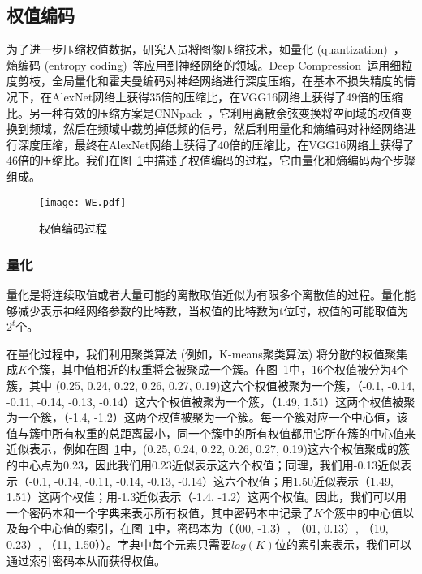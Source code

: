 \subsection{权值编码}


为了进一步压缩权值数据，研究人员将图像压缩技术，如量化 (quantization)~\cite{henneaux1992quantization}，熵编码 (entropy coding)~\cite{mackay2003information}等应用到神经网络的领域。Deep Compression~\cite{han2015deep}运用细粒度剪枝，全局量化和霍夫曼编码对神经网络进行深度压缩，在基本不损失精度的情况下，在AlexNet网络上获得35倍的压缩比，在VGG16网络上获得了49倍的压缩比。另一种有效的压缩方案是CNNpack~\cite{wang2016cnnpack}，它利用离散余弦变换将空间域的权值变换到频域，然后在频域中裁剪掉低频的信号，然后利用量化和熵编码对神经网络进行深度压缩，最终在AlexNet网络上获得了40倍的压缩比，在VGG16网络上获得了46倍的压缩比。我们在图~\ref{fig:weight_encoding}中描述了权值编码的过程，它由量化和熵编码两个步骤组成。

\begin{figure}[h]
\centering
\texttt{[image: WE.pdf]}
\caption{权值编码过程}
\label{fig:weight_encoding}
\end{figure}

\subsubsection{量化}
量化是将连续取值或者大量可能的离散取值近似为有限多个离散值的过程。量化能够减少表示神经网络参数的比特数，当权值的比特数为t位时，权值的可能取值为$2^t$个。

在量化过程中，我们利用聚类算法 (例如，K-means聚类算法) 将分散的权值聚集成$K$个簇，其中值相近的权重将会被聚成一个簇。在图~\ref{fig:weight_encoding}中，16个权值被分为4个簇，其中 (0.25, 0.24, 0.22, 0.26, 0.27, 0.19)这六个权值被聚为一个簇，（-0.1, -0.14, -0.11, -0.14, -0.13, -0.14）这六个权值被聚为一个簇，（1.49, 1.51）这两个权值被聚为一个簇，（-1.4, -1.2）这两个权值被聚为一个簇。每一个簇对应一个中心值，该值与簇中所有权重的总距离最小，同一个簇中的所有权值都用它所在簇的中心值来近似表示，例如在图~\ref{fig:weight_encoding}中，(0.25, 0.24, 0.22, 0.26, 0.27, 0.19)这六个权值聚成的簇的中心点为0.23，因此我们用0.23近似表示这六个权值；同理，我们用-0.13近似表示（-0.1, -0.14, -0.11, -0.14, -0.13, -0.14）这六个权值；用1.50近似表示（1.49, 1.51）这两个权值；用-1.3近似表示（-1.4, -1.2）这两个权值。因此，我们可以用一个密码本和一个字典来表示所有权值，其中密码本中记录了$K$个簇中的中心值以及每个中心值的索引，在图~\ref{fig:weight_encoding}中，密码本为（（00, -1.3）, （01, 0.13）, （10, 0.23）, （11, 1.50））。字典中每个元素只需要$log(K)$位的索引来表示，我们可以通过索引密码本从而获得权值。

